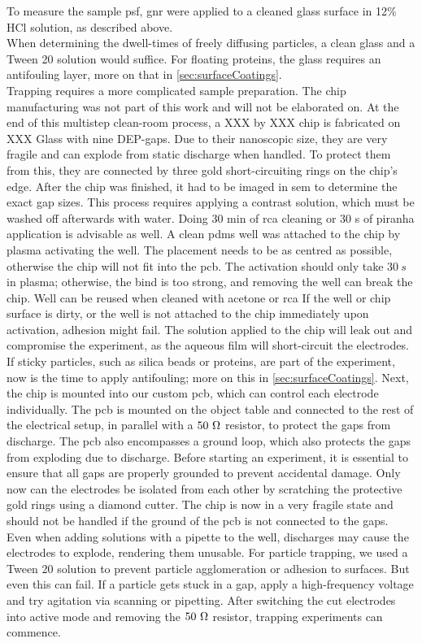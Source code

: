         To measure the sample \gls{psf}, \gls{gnr} were applied to a cleaned glass surface in 12\% HCl solution, as described above. \\       
        When determining the dwell-times of freely diffusing particles, a clean glass and a Tween 20 solution would suffice. For floating proteins, the glass requires an antifouling layer, more on that in \ref{sec:surfaceCoatings}. \\
        Trapping requires a more complicated sample preparation. The chip manufacturing was not part of this work and will not be elaborated on. At the end of this multistep clean-room process, a XXX by XXX chip is fabricated on XXX Glass with nine \gls{DEP}-gaps. Due to their nanoscopic size, they are very fragile and can explode from static discharge when handled. To protect them from this, they are connected by three gold short-circuiting rings on the chip's edge. After the chip was finished, it had to be imaged in \gls{sem} to determine the exact gap sizes. This process requires applying a contrast solution, which must be washed off afterwards with water. Doing 30 min of \gls{rca} cleaning or 30 s of \gls{piranha} application is advisable as well. A clean \gls{pdms} well was attached to the chip by plasma activating the well. The placement needs to be as centred as possible, otherwise the chip will not fit into the \gls{pcb}. The activation should only take $30~s$ in plasma; otherwise, the bind is too strong, and removing the well can break the chip. Well can be reused when cleaned with acetone or \gls{rca} If the well or chip surface is dirty, or the well is not attached to the chip immediately upon activation, adhesion might fail. The solution applied to the chip will leak out and compromise the experiment, as the aqueous film will short-circuit the electrodes. If sticky particles, such as silica beads or proteins, are part of the experiment, now is the time to apply antifouling; more on this in \ref{sec:surfaceCoatings}. Next, the chip is mounted into our custom \gls{pcb}, which can control each electrode individually. The \gls{pcb} is mounted on the object table and connected to the rest of the electrical setup, in parallel with a $50~\ohm$ resistor, to protect the gaps from discharge. The \gls{pcb} also encompasses a ground loop, which also protects the gaps from exploding due to discharge. Before starting an experiment, it is essential to ensure that all gaps are properly grounded to prevent accidental damage. Only now can the electrodes be isolated from each other by scratching the protective gold rings using a diamond cutter. The chip is now in a very fragile state and should not be handled if the ground of the \gls{pcb} is not connected to the gaps. Even when adding solutions with a pipette to the well, discharges may cause the electrodes to explode, rendering them unusable. For particle trapping, we used a Tween 20 solution to prevent particle agglomeration or adhesion to surfaces. But even this can fail. If a particle gets stuck in a gap, apply a high-frequency voltage and try agitation via scanning or pipetting. After switching the cut electrodes into active mode and removing the  $50~\ohm$ resistor, trapping experiments can commence. \\
        
